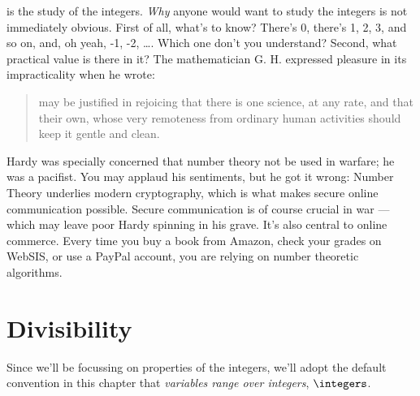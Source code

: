 \label{number_theory_chap}
 is the study of the integers.  \emph{Why} anyone
would want to study the integers is not immediately obvious.  First of
all, what's to know?  There's 0, there's 1, 2, 3, and so on, and, oh yeah,
-1, -2, \dots.   Which one don't you understand?  Second, what practical
value is there in it?
The mathematician G. H.  expressed pleasure in its
impracticality when he wrote:
%
 \begin{quotation}
  may be justified in rejoicing that there
 is one science, at any rate, and that their own, whose very remoteness
 from ordinary human activities should keep it gentle and clean.
 \end{quotation}
%

 Hardy was specially concerned that number theory not be used in
 warfare; he was a pacifist.  You may applaud his sentiments, but he
 got it wrong: Number Theory underlies modern cryptography, which is
 what makes secure online communication possible.  Secure
 communication is of course crucial in war ---which may leave poor
 Hardy spinning in his grave.  It's also central to online commerce.
 Every time you buy a book from Amazon, check your grades on WebSIS,
 or use a PayPal account, you are relying on number theoretic
 algorithms.

\section{Divisibility}\label{divisibility_sec}

Since we'll be focussing on properties of the integers, we'll adopt
the default convention in this chapter that \emph{variables range over
integers}, $\integers$.

